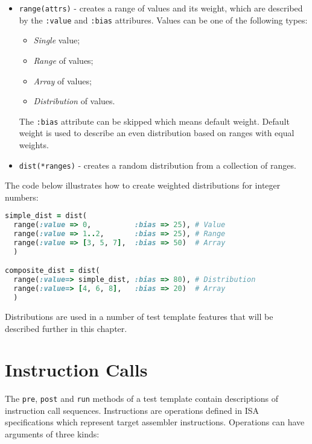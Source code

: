 \documentclass[oneside,final,12pt]{extreport}
\begin{document}
\begin{itemize}
\item \texttt{range(attrs)} - creates a range of values and its weight, which are 
      described by the \texttt{:value} and \texttt{:bias} attribures. Values can be
      one of the following types:

      \begin{itemize}
      \item \emph{Single} value;
      \item \emph{Range} of values;
      \item \emph{Array} of values;
      \item \emph{Distribution} of values.
      \end{itemize}

      The \texttt{:bias} attribute can be skipped which means default weight. Default weight
      is used to describe an even distribution based on ranges with equal weights.

\item \texttt{dist(*ranges)} - creates a random distribution from a collection of
       ranges.
\end{itemize}

The code below illustrates how to create weighted distributions for integer numbers:

\begin{lstlisting}[language=ruby]
simple_dist = dist(
  range(:value => 0,          :bias => 25), # Value
  range(:value => 1..2,       :bias => 25), # Range
  range(:value => [3, 5, 7],  :bias => 50)  # Array
  )

composite_dist = dist(
  range(:value=> simple_dist, :bias => 80), # Distribution
  range(:value=> [4, 6, 8],   :bias => 20)  # Array
  )
\end{lstlisting} 

Distributions are used in a number of test template features that will be described
further in this chapter.


\section{Instruction Calls}

The \texttt{pre}, \texttt{post} and \texttt{run} methods of a test template contain
descriptions of instruction call sequences. Instructions are operations defined
in ISA specifications which represent target assembler instructions. Operations can
have arguments of three kinds:
\end{document}
